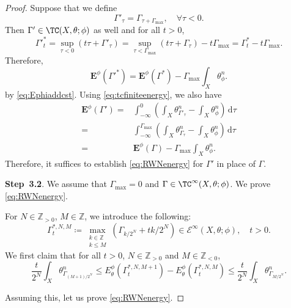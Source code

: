 \begin{proof}
    Suppose that we define
    \[
    \Gamma'_{\tau}=\Gamma_{\tau+\Gamma_{\max}},\quad \forall \tau<0.
    \]
    Then $\Gamma'\in \TC(X,\theta;\phi)$ as well and for all $t>0$,
    \[
    \Gamma'^*_t=\sup_{\tau<0} \left( t\tau+\Gamma'_{\tau} \right)=\sup_{\tau<\Gamma_{\max}} \left( t\tau+\Gamma_{\tau} \right)-t\Gamma_{\max}=\Gamma^*_t-t\Gamma_{\max}.
    \]
    Therefore,
    \[
    \mathbf{E}^{\phi}\left(\Gamma'^*\right)=\mathbf{E}^{\phi}\left(\Gamma^*\right)-\Gamma_{\max}\int_X \theta_{\phi}^n.
    \]
    by \eqref{eq:Ephiaddcst}. Using \eqref{eq:tcfiniteenergy}, we also have
    \[
    \begin{aligned}
    \mathbf{E}^{\phi}(\Gamma')=&\int_{-\infty}^0 \left( \int_X \theta_{\Gamma'_{\tau}}^n-\int_X \theta_{\phi}^n \right)\,\mathrm{d}\tau\\
    =& \int_{-\infty}^{\Gamma_{\max}}\left( \int_X \theta_{\Gamma_{\tau}}^n-\int_X \theta_{\phi}^n \right)\,\mathrm{d}\tau\\
    =& \mathbf{E}^{\phi}(\Gamma)-\Gamma_{\max}\int_X \theta_{\phi}^n.
    \end{aligned}
    \]
    Therefore, it suffices to establish \eqref{eq:RWNenergy} for $\Gamma'$ in place of $\Gamma$.

    \textbf{Step~3.2}. We assume that $\Gamma_{\max}=0$ and $\Gamma\in \TC^{\infty}(X,\theta;\phi)$. We prove \eqref{eq:RWNenergy}.

    For $N\in \mathbb{Z}_{>0}$, $M \in \mathbb{Z}$, we introduce the following:
    \[
        \Gamma^{*,N,M}_t \coloneqq \max_{\substack{k \in \mathbb{Z} \\ k \leq M}} \left(\Gamma_{k/2^N} +  tk/2^N\right)\in \mathcal{E}^{\infty}(X,\theta;\phi),\quad t>0.
    \]
    We first claim that for all $t>0$, $N\in \mathbb{Z}_{>0}$ and $M\in \mathbb{Z}_{<0}$,
    \begin{equation}\label{eq:diff_eq_I}
        \frac{t}{2^N} \int_X \theta^n_{\Gamma_{(M+1)/2^N}}\leq E_{\theta}^{\phi}\left(\Gamma_t^{*,N,M+1}\right)-E_{\theta}^{\phi}\left(\Gamma_t^{*,N,M}\right)\leq \frac{t}{2^N} \int_X \theta^n_{\Gamma_{M/2^N}}.
    \end{equation}

    Assuming this, let us prove \eqref{eq:RWNenergy}.


\end{proof}
